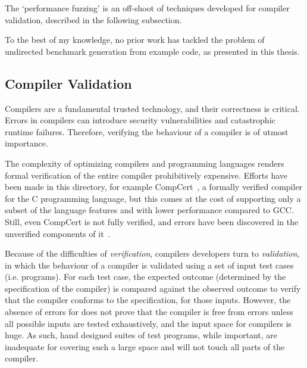 


The `performance fuzzing' is an off-shoot of techniques developed for compiler validation, described in the following subsection.

To the best of my knowledge, no prior work has tackled the problem of undirected benchmark generation from example code, as presented in this thesis.






\subsection{Compiler Validation}

Compilers are a fundamental trusted technology, and their correctness is critical. Errors in compilers can introduce security vulnerabilities and catastrophic runtime failures. Therefore, verifying the behaviour of a compiler is of utmost importance.

The complexity of optimizing compilers and programming languages renders formal verification of the entire compiler prohibitively expensive. Efforts have been made in this directory, for example CompCert~\cite{Leroy2013}, a formally verified compiler for the C programming language, but this comes at the cost of supporting only a subset of the language features and with lower performance compared to GCC. Still, even CompCert is not fully verified, and errors have been discovered in the unverified components of it~\cite{Yang2011}.

Because of the difficulties of \emph{verification}, compilers developers turn to \emph{validation}, in which the behaviour of a compiler is validated using a set of input test cases (i.e. programs). For each test case, the expected outcome (determined by the specification of the compiler) is compared against the observed outcome to verify that the compiler conforms to the specification, for those inputs. However, the absence of errors for does not prove that the compiler is free from errors unless all possible inputs are tested exhaustively, and the input space for compilers is huge. As such, hand designed suites of test programs, while important, are inadequate for covering such a large space and will not touch all parts of the compiler.

